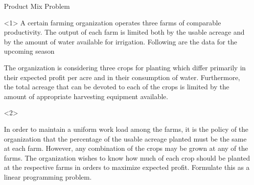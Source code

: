 \begin{frameExample}{Product Mix Problem}{}
  \begin{onlyenv}<1>
    A certain farming organization operates three farms of comparable productivity. The output of each farm is limited both by the usable acreage and by the amount of water available for irrigation. Following are the data for the upcoming season

  {\centering
  \par}
  The organization is considering three crops for planting which differ primarily in their expected profit per acre and in their consumption of water. Furthermore, the total acreage that can be devoted to each of the crops is limited by the amount of appropriate harvesting equipment available.
\end{onlyenv}

\begin{onlyenv}<2>
  {\centering
    \par}

  In order to maintain a uniform work load among the farms, it is the policy of the organization that the percentage of the usable acreage planted must be the same at each farm. However, any combination of the crops may be grown at any of the farms. The organization wishes to know how much of each crop should be planted at the respective farms in orders to maximize expected profit. Formulate this as a linear programming problem.
\end{onlyenv}
\end{frameExample}



